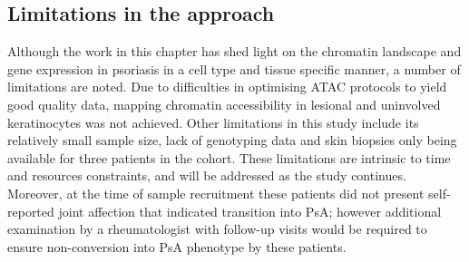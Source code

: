 \subsection{Limitations in the approach}
Although the work in this chapter has shed light on the chromatin landscape and gene expression in psoriasis in a cell type and tissue specific manner, a number of limitations are noted.  Due to difficulties in optimising ATAC protocols to yield good quality data, mapping chromatin accessibility in lesional and uninvolved keratinocytes was not achieved. %
Other limitations in this study include its relatively small sample size, lack of genotyping data and skin biopsies only being available for three patients in the cohort. These limitations are intrinsic to time and resources constraints, and will be addressed as the study continues. Moreover, at the time of sample recruitment these patients did not present self-reported joint affection that indicated transition into PsA; however additional examination by a rheumatologist with follow-up visits would be required to ensure non-conversion into PsA phenotype by these patients. %

